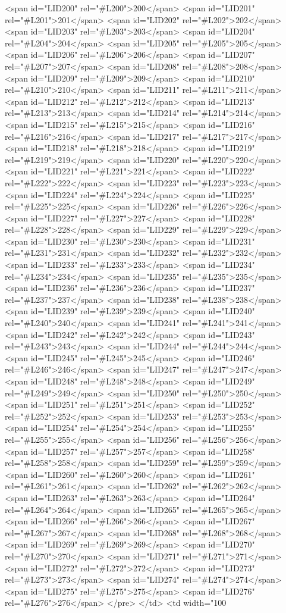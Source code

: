 <span id="LID200" rel="#L200">200</span>
<span id="LID201" rel="#L201">201</span>
<span id="LID202" rel="#L202">202</span>
<span id="LID203" rel="#L203">203</span>
<span id="LID204" rel="#L204">204</span>
<span id="LID205" rel="#L205">205</span>
<span id="LID206" rel="#L206">206</span>
<span id="LID207" rel="#L207">207</span>
<span id="LID208" rel="#L208">208</span>
<span id="LID209" rel="#L209">209</span>
<span id="LID210" rel="#L210">210</span>
<span id="LID211" rel="#L211">211</span>
<span id="LID212" rel="#L212">212</span>
<span id="LID213" rel="#L213">213</span>
<span id="LID214" rel="#L214">214</span>
<span id="LID215" rel="#L215">215</span>
<span id="LID216" rel="#L216">216</span>
<span id="LID217" rel="#L217">217</span>
<span id="LID218" rel="#L218">218</span>
<span id="LID219" rel="#L219">219</span>
<span id="LID220" rel="#L220">220</span>
<span id="LID221" rel="#L221">221</span>
<span id="LID222" rel="#L222">222</span>
<span id="LID223" rel="#L223">223</span>
<span id="LID224" rel="#L224">224</span>
<span id="LID225" rel="#L225">225</span>
<span id="LID226" rel="#L226">226</span>
<span id="LID227" rel="#L227">227</span>
<span id="LID228" rel="#L228">228</span>
<span id="LID229" rel="#L229">229</span>
<span id="LID230" rel="#L230">230</span>
<span id="LID231" rel="#L231">231</span>
<span id="LID232" rel="#L232">232</span>
<span id="LID233" rel="#L233">233</span>
<span id="LID234" rel="#L234">234</span>
<span id="LID235" rel="#L235">235</span>
<span id="LID236" rel="#L236">236</span>
<span id="LID237" rel="#L237">237</span>
<span id="LID238" rel="#L238">238</span>
<span id="LID239" rel="#L239">239</span>
<span id="LID240" rel="#L240">240</span>
<span id="LID241" rel="#L241">241</span>
<span id="LID242" rel="#L242">242</span>
<span id="LID243" rel="#L243">243</span>
<span id="LID244" rel="#L244">244</span>
<span id="LID245" rel="#L245">245</span>
<span id="LID246" rel="#L246">246</span>
<span id="LID247" rel="#L247">247</span>
<span id="LID248" rel="#L248">248</span>
<span id="LID249" rel="#L249">249</span>
<span id="LID250" rel="#L250">250</span>
<span id="LID251" rel="#L251">251</span>
<span id="LID252" rel="#L252">252</span>
<span id="LID253" rel="#L253">253</span>
<span id="LID254" rel="#L254">254</span>
<span id="LID255" rel="#L255">255</span>
<span id="LID256" rel="#L256">256</span>
<span id="LID257" rel="#L257">257</span>
<span id="LID258" rel="#L258">258</span>
<span id="LID259" rel="#L259">259</span>
<span id="LID260" rel="#L260">260</span>
<span id="LID261" rel="#L261">261</span>
<span id="LID262" rel="#L262">262</span>
<span id="LID263" rel="#L263">263</span>
<span id="LID264" rel="#L264">264</span>
<span id="LID265" rel="#L265">265</span>
<span id="LID266" rel="#L266">266</span>
<span id="LID267" rel="#L267">267</span>
<span id="LID268" rel="#L268">268</span>
<span id="LID269" rel="#L269">269</span>
<span id="LID270" rel="#L270">270</span>
<span id="LID271" rel="#L271">271</span>
<span id="LID272" rel="#L272">272</span>
<span id="LID273" rel="#L273">273</span>
<span id="LID274" rel="#L274">274</span>
<span id="LID275" rel="#L275">275</span>
<span id="LID276" rel="#L276">276</span>
</pre>
          </td>
          <td width="100%
            
